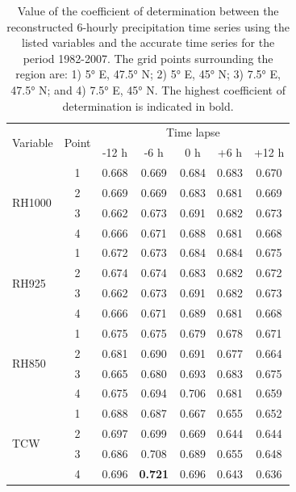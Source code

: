 \documentclass[hess, manuscript]{copernicus}
\begin{document}
	\begin{table}[htb]
		\caption{Value of the coefficient of determination between the reconstructed 6-hourly precipitation time series using the listed variables and the accurate time series for the period 1982-2007. The grid points surrounding the region are: 1) 5° E, 47.5° N; 2) 5° E, 45° N; 3) 7.5° E, 47.5° N; and 4) 7.5° E, 45° N. The highest coefficient of determination is indicated in bold.}
		\begin{center}
			\begin{tabular}{l c c c c c c}
				\hline
				\multirow{2}{*}{Variable} & \multirow{2}{*}{Point} &  \multicolumn{5}{c}{Time lapse} \\
				&  & -12 h & -6 h & 0 h & +6 h & +12 h \\ 
				\hline
				\multirow{ 4}{*}{RH1000} & 1 & 0.668 & 0.669 & 0.684 & 0.683 & 0.670 \\
				& 2 & 0.669 & 0.669 & 0.683 & 0.681 & 0.669 \\
				& 3 & 0.662 & 0.673 & 0.691 & 0.682 & 0.673 \\
				& 4 & 0.666 & 0.671 & 0.688 & 0.681 & 0.668 \\ \hline
				\multirow{ 4}{*}{RH925} & 1 & 0.672 & 0.673 & 0.684 & 0.684 & 0.675 \\
				& 2 & 0.674 & 0.674 & 0.683 & 0.682 & 0.672 \\
				& 3 & 0.662 & 0.673 & 0.691 & 0.682 & 0.673 \\
				& 4 & 0.666 & 0.671 & 0.689 & 0.681 & 0.668 \\ \hline
				\multirow{ 4}{*}{RH850} & 1 & 0.675 & 0.675 & 0.679 & 0.678 & 0.671 \\
				& 2 & 0.681 & 0.690 & 0.691 & 0.677 & 0.664 \\
				& 3 & 0.665 & 0.680 & 0.693 & 0.683 & 0.675 \\
				& 4 & 0.675 & 0.694 & 0.706 & 0.681 & 0.659 \\ \hline
				\multirow{ 4}{*}{TCW} & 1 & 0.688 & 0.687 & 0.667 & 0.655 & 0.652 \\
				& 2 & 0.697 & 0.699 & 0.669 & 0.644 & 0.644 \\
				& 3 & 0.686 & 0.708 & 0.689 & 0.655 & 0.648 \\
				& 4 & 0.696 & \textbf{0.721} & 0.696 & 0.643 & 0.636 \\ \hline
			\end{tabular}
		\end{center}
		\label{table:proxy_correlations}
	\end{table}
	
\end{document}

